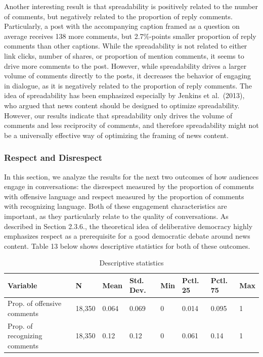 \documentclass[
]{article}
\begin{document}
Another interesting result is that spreadability is positively related
to the number of comments, but negatively related to the proportion of
reply comments. Particularly, a post with the accompanying caption
framed as a question on average receives 138 more comments, but
2.7\%-points smaller proportion of reply comments than other captions.
While the spreadability is not related to either link clicks, number of
shares, or proportion of mention comments, it seems to drive more
comments to the post. However, while spreadability drives a larger
volume of comments directly to the posts, it decreases the behavior of
engaging in dialogue, as it is negatively related to the proportion of
reply comments. The idea of spreadability has been emphasized especially
by Jenkins et al.~(2013), who argued that news content should be
designed to optimize spreadability. However, our results indicate that
spreadability only drives the volume of comments and less reciprocity of
comments, and therefore spreadability might not be a universally
effective way of optimizing the framing of news content.

\hypertarget{respect-and-disrespect}{%
\subsubsection{Respect and Disrespect}\label{respect-and-disrespect}}

\noindent In this section, we analyze the results for the next two
outcomes of how audiences engage in conversations: the disrespect
measured by the proportion of comments with offensive language and
respect measured by the proportion of comments with recognizing
language. Both of these engagement characteristics are important, as
they particularly relate to the quality of conversations. As described
in Section 2.3.6., the theoretical idea of deliberative democracy highly
emphasizes respect as a prerequisite for a good democratic debate around
news content. Table 13 below shows descriptive statistics for both of
these outcomes.

\begin{table}[H]

\caption{\label{tab:hate_describe}Descriptive statistics}
\centering
\begin{tabular}[t]{llllllll}
\toprule
Variable & N & Mean & Std. Dev. & Min & Pctl. 25 & Pctl. 75 & Max\\
\midrule
Prop. of offensive comments & 18,350 & 0.064 & 0.069 & 0 & 0.014 & 0.095 & 1\\
Prop. of recognizing comments & 18,350 & 0.12 & 0.12 & 0 & 0.061 & 0.14 & 1\\
\bottomrule
\end{tabular}
\end{table}
\end{document}
